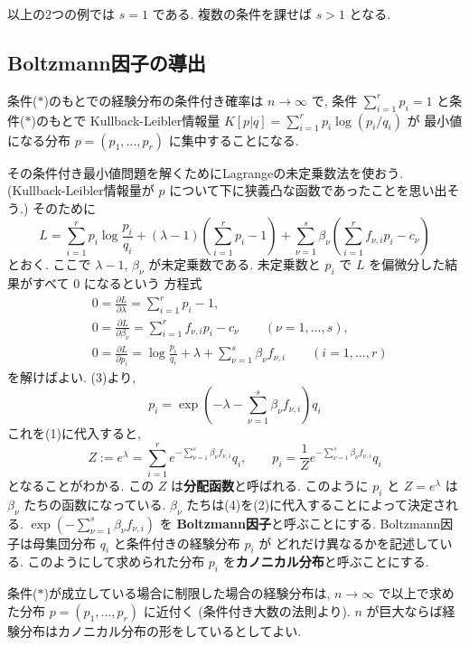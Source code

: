 \documentclass[12pt,twoside]{jarticle}
\renewcommand\d{\partial}
\theoremstyle{definition} %
\theoremstyle{definition} %
\theoremstyle{definition} %
\numberwithin{theorem}{section}
\numberwithin{equation}{section}
\numberwithin{figure}{section}
\numberwithin{table}{section}
\begin{document}
以上の2つの例では $s=1$ である.  複数の条件を課せば $s>1$ となる.


\subsection{Boltzmann因子の導出}

条件($*$)のもとでの経験分布の条件付き確率は $n\to\infty$ で, 
条件 $\sum_{i=1}^r p_i=1$ と条件($*$)のもとで
Kullback-Leibler情報量 $K[p|q]=\sum_{i=1}^r p_i\log(p_i/q_i)$ が
最小値になる分布 $p=(p_1,\ldots,p_r)$ に集中することになる.

その条件付き最小値問題を解くためにLagrangeの未定乗数法を使おう.
(Kullback-Leibler情報量が $p$ について下に狭義凸な函数であったことを思い出そう.)
そのために
\[
L 
= \sum_{i=1}^r p_i \log\frac{p_i}{q_i} 
+ (\lambda-1)\left(\sum_{i=1}^r p_i-1\right)
+ \sum_{\nu=1}^s\beta_\nu\left(\sum_{i=1}^r f_{\nu,i}p_i - c_\nu \right)
\]
とおく. ここで $\lambda-1$, $\beta_\nu$ が未定乗数である.
未定乗数と $p_i$ で $L$ を偏微分した結果がすべて $0$ になるという
方程式
\begin{align*}
&
0=\frac{\d L}{\d\lambda} = \sum_{i=1}^r p_i - 1,
\tag{1}
\\ &
0=\frac{\d L}{\d\beta_\nu} = \sum_{i=1}^r f_{\nu,i}p_i - c_\nu
\qquad (\nu=1,\ldots,s),
\tag{2}
\\ &
0=\frac{\d L}{\d p_i} = \log\frac{p_i}{q_i} + \lambda + \sum_{\nu=1}^s \beta_\nu f_{\nu,i}
\qquad (i=1,\ldots,r)
\tag{3} 
\end{align*}
を解けばよい. (3)より,
\[
p_i = \exp\left(-\lambda-\sum_{\nu=1}^s \beta_\nu f_{\nu,i} \right)q_i
\]
これを(1)に代入すると,
\[
Z:= e^\lambda 
= \sum_{i=1}^r e^{-\sum_{\nu=1}^s \beta_\nu f_{\nu,i}}q_i,
\qquad
p_i = \frac{1}{Z}e^{-\sum_{\nu=1}^s \beta_\nu f_{\nu,i}}q_i
\tag{4}
\]
となることがわかる. この $Z$ は{\bf 分配函数}と呼ばれる.
このように $p_i$ と $Z=e^\lambda$ は $\beta_\nu$ たちの函数になっている. 
$\beta_\nu$ たちは(4)を(2)に代入することによって決定される.
$\exp\left(-\sum_{\nu=1}^s \beta_\nu f_{\nu,i}\right)$ を
{\bf Boltzmann因子}と呼ぶことにする.
Boltzmann因子は母集団分布 $q_i$ と条件付きの経験分布 $p_i$ が
どれだけ異なるかを記述している.
このようにして求められた分布 $p_i$ を{\bf カノニカル分布}と呼ぶことにする.

条件($*$)が成立している場合に制限した場合の経験分布は,
$n\to\infty$ で以上で求めた分布 $p=(p_1,\ldots,p_r)$ に近付く
(条件付き大数の法則より). 
$n$ が巨大ならば経験分布はカノニカル分布の形をしているとしてよい.
\end{document}
